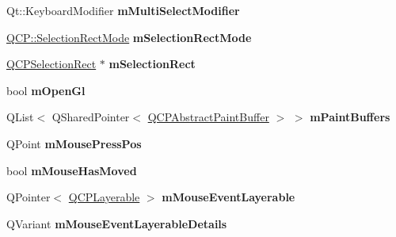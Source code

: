 \begin{DoxyCompactItemize}
\item 
\mbox{\label{class_q_custom_plot_a0e97e701c5671e7e463d2ce0211d0f8a}} 
Qt\+::\+Keyboard\+Modifier {\bfseries m\+Multi\+Select\+Modifier}
\item 
\mbox{\label{class_q_custom_plot_abe04c5def373cc4fede8de20542ca3f2}} 
\mbox{\hyperlink{namespace_q_c_p_ac9aa4d6d81ac76b094f9af9ad2d3aacf}{Q\+C\+P\+::\+Selection\+Rect\+Mode}} {\bfseries m\+Selection\+Rect\+Mode}
\item 
\mbox{\label{class_q_custom_plot_a4827bc84ef5ce52dfbf9ff630ed1b276}} 
\mbox{\hyperlink{class_q_c_p_selection_rect}{Q\+C\+P\+Selection\+Rect}} $\ast$ {\bfseries m\+Selection\+Rect}
\item 
\mbox{\label{class_q_custom_plot_a0841dbea13bd120d20e3f0cc36767ff9}} 
bool {\bfseries m\+Open\+Gl}
\item 
\mbox{\label{class_q_custom_plot_a57b270b1e3990e0d1b9fb39b137d5a5d}} 
Q\+List$<$ Q\+Shared\+Pointer$<$ \mbox{\hyperlink{class_q_c_p_abstract_paint_buffer}{Q\+C\+P\+Abstract\+Paint\+Buffer}} $>$ $>$ {\bfseries m\+Paint\+Buffers}
\item 
\mbox{\label{class_q_custom_plot_ac57090da95056ae4dd67be67adfa85bd}} 
Q\+Point {\bfseries m\+Mouse\+Press\+Pos}
\item 
\mbox{\label{class_q_custom_plot_ad2108936f001a8be5974b0b6ff13dae3}} 
bool {\bfseries m\+Mouse\+Has\+Moved}
\item 
\mbox{\label{class_q_custom_plot_a243867f445d2f4e35e00add2f589e1da}} 
Q\+Pointer$<$ \mbox{\hyperlink{class_q_c_p_layerable}{Q\+C\+P\+Layerable}} $>$ {\bfseries m\+Mouse\+Event\+Layerable}
\item 
\mbox{\label{class_q_custom_plot_ad604958ef16fc022c474521a08d88a2d}} 
Q\+Variant {\bfseries m\+Mouse\+Event\+Layerable\+Details}
\item 
\mbox{\label{class_q_custom_plot_ab30daeca6612c3948afd368dce5f1c39}} 

\end{DoxyCompactItemize}

